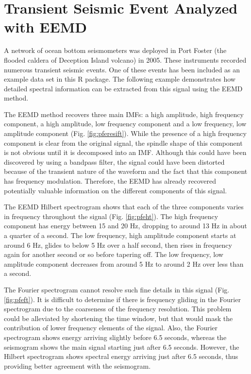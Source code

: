 \documentclass[12pt]{article}
\begin{document}
\FloatBarrier

\section{Transient Seismic Event Analyzed with EEMD}

A network of ocean bottom seismometers was deployed in Port Foster  (the flooded caldera of Deception Island volcano) in 2005.
These instruments recorded numerous transient seismic events.
One of these events has been included as an example data set in this R package.
The following example demonstrates how detailed spectral information can be extracted from this signal using the EEMD method.

The EEMD method recovers three main IMFs: a high amplitude, high frequency component, a high amplitude, low frequency component and a low frequency, low amplitude component (Fig. \ref{fig:pferesift}).
While the presence of a high frequency component is clear from the original signal, the spindle shape of this component is not obvious until it is decomposed into an IMF.
Although this could have been discovered by using a bandpass filter, the signal could have been distorted because of the transient nature of the waveform and the fact that this component has frequency modulation.
Therefore, the EEMD has already recovered potentially valuable information on the different components of this signal.

The EEMD Hilbert spectrogram shows that each of the three components varies in frequency throughout the signal (Fig. \ref{fig:pfeht}).
The high frequency component has energy between 15 and 20 Hz, dropping to around 13 Hz in about a quarter of a second.
The low frequency, high amplitude component starts at around 6 Hz, glides to below 5 Hz over a half second, then rises in frequency again for another second or so before tapering off.
The low frequency, low amplitude component decreases from around 5 Hz to around 2 Hz over less than a second.

The Fourier spectrogram cannot resolve such fine details in this signal (Fig. \ref{fig:pfeft}).
It is difficult to determine if there is frequency gliding in the Fourier spectrogram due to the coarseness of the frequency resolution.
This problem could be alleviated by shortening the time window, but that would mask the contribution of lower frequency elements of the signal.
Also, the Fourier spectrogram shows energy arriving slightly before 6.5 seconds, whereas the seismogram shows the main signal starting just after 6.5 seconds.
However, the Hilbert spectrogram shows spectral energy arriving just after 6.5 seconds, thus providing better agreement with the seismogram.
\end{document}
